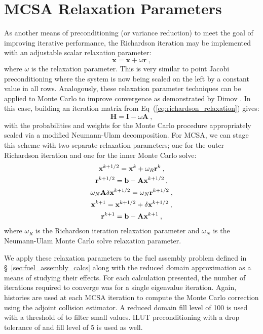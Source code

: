 \chapter{MCSA Relaxation Parameters\ }
\label{chap:spn_mcsa_relaxation}
As another means of preconditioning (or variance reduction) to meet
the goal of improving iterative performance, the Richardson iteration
may be implemented with an adjustable scalar relaxation parameter:
\begin{equation}
  \mathbf{x} = \mathbf{x} + \omega \mathbf{r}\:,
  \label{eq:richardson_relaxation}
\end{equation}
where $\omega$ is the relaxation parameter. This is very similar to
point Jacobi preconditioning where the system is now being scaled on
the left by a constant value in all rows. Analogously, these
relaxation parameter techniques can be applied to Monte Carlo to
improve convergence as demonstrated by Dimov \cite{dimov_new_1998}. In
this case, building an iteration matrix from
Eq~(\ref{eq:richardson_relaxation}) gives:
\begin{equation}
  \mathbf{H} = \mathbf{I} - \omega \mathbf{A}\:,
  \label{eq:relaxed_iteration_matrix}
\end{equation}
with the probabilities and weights for the Monte Carlo procedure
appropriately scaled via a modified Neumann-Ulam decomposition. For
MCSA, we can stage this scheme with two separate relaxation
parameters; one for the outer Richardson iteration and one for the
inner Monte Carlo solve:
\begin{subequations}
  \begin{gather}
    \mathbf{x}^{k+1/2} = \mathbf{x}^k + \omega_R \mathbf{r}^k\:,\\ \mathbf{r}^{k+1/2}
    = \mathbf{b} -
    \mathbf{A}\mathbf{x}^{k+1/2}\:,\\ \omega_N\mathbf{A}\delta\mathbf{x}^{k+1/2} =
    \omega_N\mathbf{r}^{k+1/2}\:,\\ \mathbf{x}^{k+1} = \mathbf{x}^{k+1/2} + \delta
    \mathbf{x}^{k+1/2}\:,\\ \mathbf{r}^{k+1} = \mathbf{b} - \mathbf{A}\mathbf{x}^{k+1}\:,
  \end{gather}
  \label{eq:mcsa_relaxed}
\end{subequations}
where $\omega_R$ is the Richardson iteration relaxation parameter and
$\omega_N$ is the Neumann-Ulam Monte Carlo solve relaxation parameter.

We apply these relaxation parameters to the fuel assembly problem
defined in \S~\ref{sec:fuel_assembly_calcs} along with the reduced
domain approximation as a means of studying their effects. For each
calculation presented, the number of iterations required to converge
was for a single eigenvalue iteration.  Again,  histories are
used at each MCSA iteration to compute the Monte Carlo correction
using the adjoint collision estimator. A reduced domain fill level of
100 is used with a threshold of  to filter small
values. ILUT preconditioning with a drop tolerance of  and
fill level of 5 is used as well.

